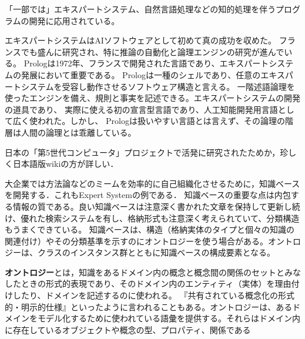 \documentclass[uplatex, dvipdfmx]{jsreport}
\begin{document}
\begin{application}
    「一部では」エキスパートシステム、自然言語処理などの知的処理を伴うプログラムの開発に応用されている。

    エキスパートシステムはAIソフトウェアとして初めて真の成功を収めた。
    フランスでも盛んに研究され、特に推論の自動化と論理エンジンの研究が進んでいる。
    Prologは1972年、フランスで開発された言語であり、エキスパートシステムの発展において重要である。
    Prologは一種のシェルであり、任意のエキスパートシステムを受容し動作させるソフトウェア構造と言える。
    一階述語論理を使ったエンジンを備え、規則と事実を記述できる。エキスパートシステムの開発の道具であり、
    実際に使える初の宣言型言語であり、人工知能開発用言語として広く使われた。しかし、
    Prologは扱いやすい言語とは言えず、その論理の階層は人間の論理とは乖離している。
\end{application}
\begin{remark}
    日本の「第5世代コンピュータ」プロジェクトで活発に研究されたためか，珍しく日本語版wikiの方が詳しい．
\end{remark}

\begin{definition}
    大企業では方法論などのミームを効率的に自己組織化させるために，知識ベースを開発する．これもExpert Systemの例である．
    知識ベースの重要な点は内包する情報の質である。良い知識ベースは注意深く書かれた文章を保持して更新し続け、優れた検索システムを有し、格納形式も注意深く考えられていて、分類構造もうまくできている。
    知識ベースは、構造（格納実体のタイプと個々の知識の関連付け）やその分類基準を示すのにオントロジーを使う場合がある。オントロジーは、クラスのインスタンス群とともに知識ベースの構成要素となる。

    \textbf{オントロジー}とは，知識をあるドメイン内の概念と概念間の関係のセットとみなしたときの形式的表現であり、そのドメイン内のエンティティ（実体）を理由付けしたり、ドメインを記述するのに使われる。
    『共有されている概念化の形式的・明示的仕様』といったように言われることもある。オントロジーは、あるドメインをモデル化するために使われている語彙を提供する。それらはドメイン内に存在しているオブジェクトや概念の型、プロパティ、関係である
\end{definition}
\end{document}
